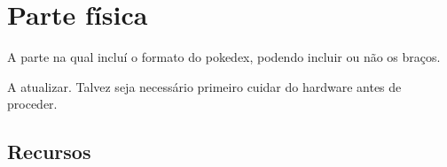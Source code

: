 \documentclass[../main.tex]{subfiles}
\begin{document}
\section{Parte física}

A parte na qual incluí o formato do pokedex, podendo incluir ou não os braços. \newline

A atualizar. Talvez seja necessário primeiro cuidar do hardware antes de proceder. \newline

\subsection{Recursos}
\end{document}
